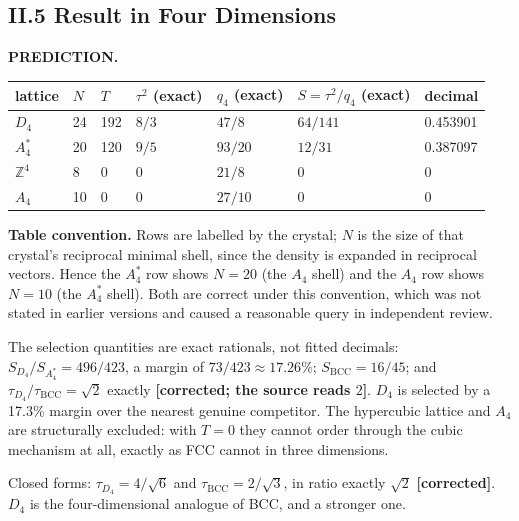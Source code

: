 \documentclass[11pt,a4paper]{article}
\begin{document}
\subsection{II.5 Result in Four Dimensions}
\textbf{PREDICTION.}
\begin{center}
\begin{tabular}{lllllll}
\toprule
lattice & $N$ & $T$ & $\tau^2$ (exact) & $q_4$ (exact) & $S = \tau^2/q_4$ (exact) & decimal \\
\midrule
$D_4$ & 24 & 192 & $8/3$ & $47/8$ & $64/141$ & 0.453901 \\
$A_4^*$ & 20 & 120 & $9/5$ & $93/20$ & $12/31$ & 0.387097 \\
$\mathbb{Z}^4$ & 8 & 0 & 0 & $21/8$ & 0 & 0 \\
$A_4$ & 10 & 0 & 0 & $27/10$ & 0 & 0 \\
\bottomrule
\end{tabular}
\end{center}
\textbf{Table convention.} Rows are labelled by the crystal; $N$ is the size of that crystal's reciprocal minimal shell, since the density is expanded in reciprocal vectors. Hence the $A_4^*$ row shows $N = 20$ (the $A_4$ shell) and the $A_4$ row shows $N = 10$ (the $A_4^*$ shell). Both are correct under this convention, which was not stated in earlier versions and caused a reasonable query in independent review.

The selection quantities are exact rationals, not fitted decimals: $S_{D_4}/S_{A_4^*} = 496/423$, a margin of $73/423 \approx 17.26\%$; $S_{\mathrm{BCC}} = 16/45$; and $\tau_{D_4}/\tau_{\mathrm{BCC}} = \sqrt{2}$ exactly \textbf{[corrected; the source reads $2$]}. $D_4$ is selected by a 17.3\% margin over the nearest genuine competitor. The hypercubic lattice and $A_4$ are structurally excluded: with $T = 0$ they cannot order through the cubic mechanism at all, exactly as FCC cannot in three dimensions.

Closed forms: $\tau_{D_4} = 4/\sqrt{6}$ and $\tau_{\mathrm{BCC}} = 2/\sqrt{3}$, in ratio exactly $\sqrt{2}$ \textbf{[corrected]}. $D_4$ is the four-dimensional analogue of BCC, and a stronger one.
\end{document}
